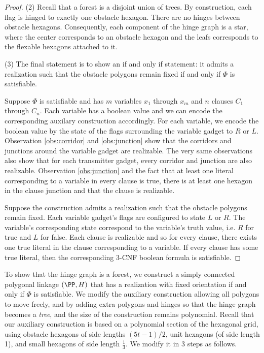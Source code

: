 \begin{proof}
\noindent (2) Recall that a forest is a disjoint union of trees. 
By construction, each flag is hinged to exactly one obstacle hexagon.  
There are no hinges between obstacle hexagons.
Consequently, each component of the hinge graph is a star, where the center corresponds to an obstacle hexagon and the leafs corresponds to the flexable hexagons attached to it.

\noindent (3) The final statement is to show an if and only if statement: it admits a realization such that the obstacle polygons remain fixed if and only if $\Phi$ is satisfiable.

Suppose $\Phi$ is satisfiable and has $m$ variables $x_1$ through $x_m$ and $n$ clauses $C_1$ through $C_n$.
Each variable has a boolean value and we can encode the corresponding auxilary construction accordingly. 
For each variable, we encode the boolean value by the state of the flags surrounding the variable gadget to $R$ or $L$.  
Observation \ref{obs:corridor} and \ref{obs:junction} show that the corridors and junctions around the variable gadget are realizable.
The very same observations also show that for each transmitter gadget, every corridor and junction are also realizable. 
Observation \ref{obs:junction} and the fact that at least one literal corresponding to a variable in every clause is true, there is at least one hexagon in the clause junction and that the clause is realizable.

Suppose the construction admits a realization such that the obstacle polygons remain fixed.
Each variable gadget's flags are configured to state $L$ or $R$. 
The variable's corresponding state correspond to the variable's truth value, i.e. $R$ for true and $L$ for false.
Each clause is realizable and so for every clause, there exists one true literal in the clause corresponding to a variable.  
If every clause has some true literal, then the corresponding 3-CNF boolean formula is satisfiable.
\end{proof}
To show that the hinge graph is a forest, we construct a simply connected polygonal linkage $(\PP,H)$ that has a realization with fixed orientation if and only if $\Phi$ is satisfiable.
We modify the auxiliary construction allowing all polygons to move freely, and by adding extra polygons and hinges so that the hinge graph becomes a \emph{tree}, and the size of the construction remains polynomial. 
Recall that our auxiliary construction is based on a polynomial section of the hexagonal grid, using obstacle hexagons of side lengths $(5t-1)/2$, unit hexagons (of side length 1), and small hexagons of side length $\frac{1}{3}$. 
We modify it in 3 steps as follows.

